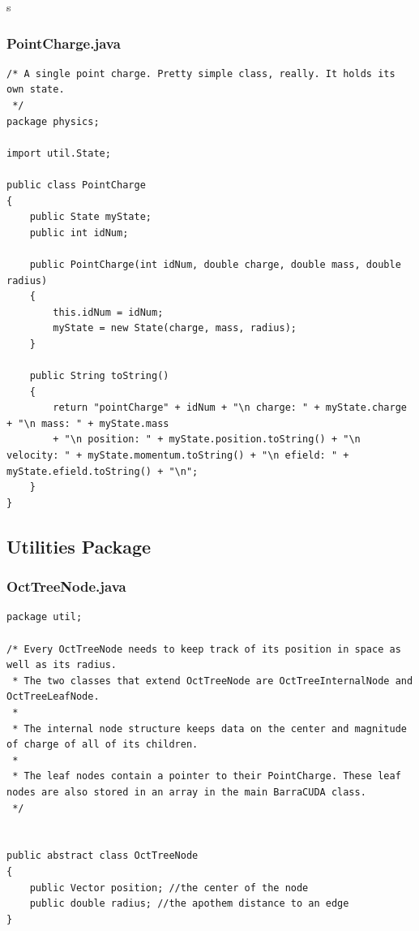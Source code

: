 s\documentclass[10pt]{article}
\begin{document}
\subsubsection{PointCharge.java}
\begin{verbatim}
/* A single point charge. Pretty simple class, really. It holds its own state.
 */
package physics;

import util.State;

public class PointCharge 
{
	public State myState;
	public int idNum;
	
	public PointCharge(int idNum, double charge, double mass, double radius)
	{
		this.idNum = idNum;
		myState = new State(charge, mass, radius);
	}
	
	public String toString()
	{
		return "pointCharge" + idNum + "\n charge: " + myState.charge + "\n mass: " + myState.mass 
		+ "\n position: " + myState.position.toString() + "\n velocity: " + myState.momentum.toString() + "\n efield: " + myState.efield.toString() + "\n";
	}
}

\end{verbatim}

\subsection{Utilities Package}

\subsubsection{OctTreeNode.java}
\begin{verbatim}
package util;

/* Every OctTreeNode needs to keep track of its position in space as well as its radius.
 * The two classes that extend OctTreeNode are OctTreeInternalNode and OctTreeLeafNode.
 * 
 * The internal node structure keeps data on the center and magnitude of charge of all of its children.
 * 
 * The leaf nodes contain a pointer to their PointCharge. These leaf nodes are also stored in an array in the main BarraCUDA class. 
 */


public abstract class OctTreeNode 
{
	public Vector position; //the center of the node
	public double radius; //the apothem distance to an edge
}
\end{verbatim}
\end{document}

